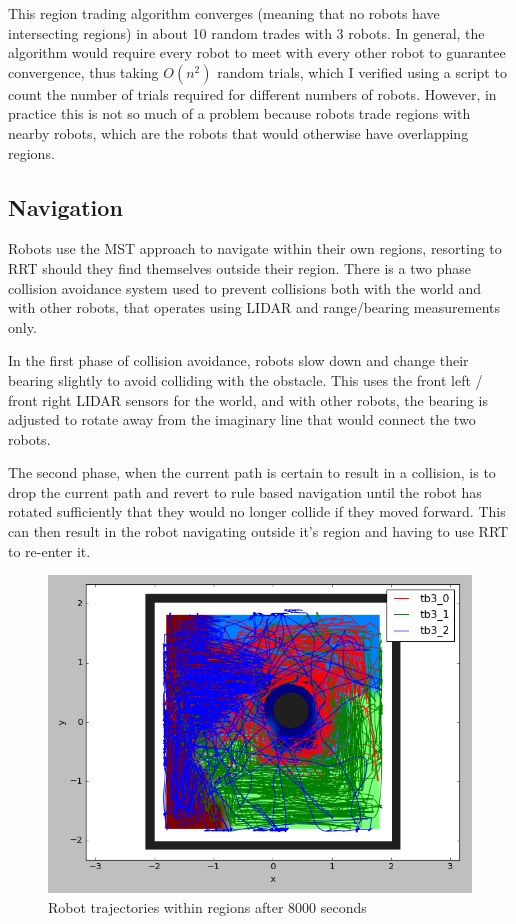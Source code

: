 \documentclass[a4paper, 10pt, conference]{ieeeconf}      %
\begin{document}
This region trading algorithm converges (meaning that no robots have intersecting regions) in about 10 random trades with 3 robots. In general, the algorithm would require every robot to meet with every other robot to guarantee convergence, thus taking $O(n^2)$ random trials, which I verified using a script to count the number of trials required for different numbers of robots. However, in practice this is not so much of a problem because robots trade regions with nearby robots, which are the robots that would otherwise have overlapping regions.

\subsection{Navigation}
Robots use the MST approach to navigate within their own regions, resorting to RRT should they find themselves outside their region. There is a two phase collision avoidance system used to prevent collisions both with the world and with other robots, that operates using LIDAR and range/bearing measurements only.

In the first phase of collision avoidance, robots slow down and change their bearing slightly to avoid colliding with the obstacle. This uses the front left / front right LIDAR sensors for the world, and with other robots, the bearing is adjusted to rotate away from the imaginary line that would connect the two robots.

The second phase, when the current path is certain to result in a collision, is to drop the current path and revert to rule based navigation until the robot has rotated sufficiently that they would no longer collide if they moved forward. This can then result in the robot navigating outside it's region and having to use RRT to re-enter it.

\begin{figure}
	\includegraphics[width=\columnwidth]{dec_t2_cover.png}
	\caption{Robot trajectories within regions after 8000 seconds}
    \label{fig:decCover}
\end{figure}
\end{document}
